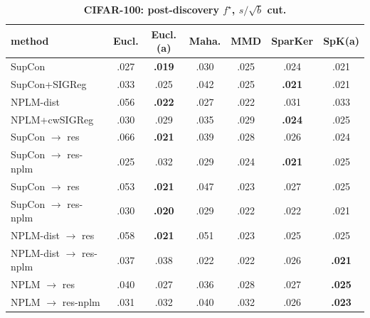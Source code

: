 \documentclass[10pt]{article}
\begin{document}
\begin{table}[t]
\centering
\footnotesize

\begin{tabular}{lcccccc}
\toprule
method & Eucl. & Eucl.(a) & Maha. & MMD & SparKer & SpK(a) \\
\midrule
SupCon & .027 & \textbf{.019} & .030 & .025 & .024 & .021 \\
SupCon+SIGReg & .033 & .025 & .042 & .025 & \textbf{.021} & .021 \\
NPLM-dist & .056 & \textbf{.022} & .027 & .022 & .031 & .033 \\
NPLM+cwSIGReg & .030 & .029 & .035 & .029 & \textbf{.024} & .025 \\
\quad SupCon $\to$ res & .066 & \textbf{.021} & .039 & .028 & .026 & .024 \\
\quad SupCon $\to$ res-nplm & .025 & .032 & .029 & .024 & \textbf{.021} & .025 \\
\quad SupCon $\to$ res & .053 & \textbf{.021} & .047 & .023 & .027 & .025 \\
\quad SupCon $\to$ res-nplm & .030 & \textbf{.020} & .029 & .022 & .022 & .021 \\
\quad NPLM-dist $\to$ res & .058 & \textbf{.021} & .051 & .023 & .025 & .025 \\
\quad NPLM-dist $\to$ res-nplm & .037 & .038 & .022 & .022 & .026 & \textbf{.021} \\
\quad NPLM $\to$ res & .040 & .027 & .036 & .028 & .027 & \textbf{.025} \\
\quad NPLM $\to$ res-nplm & .031 & .032 & .040 & .032 & .026 & \textbf{.023} \\
\bottomrule
\end{tabular}

\caption{\textbf{CIFAR-100: post-discovery $f^\star$, $s/\sqrt{b}$ cut.}}
\label{tab:CIFAR-100ssb}
\end{table}
\end{document}
